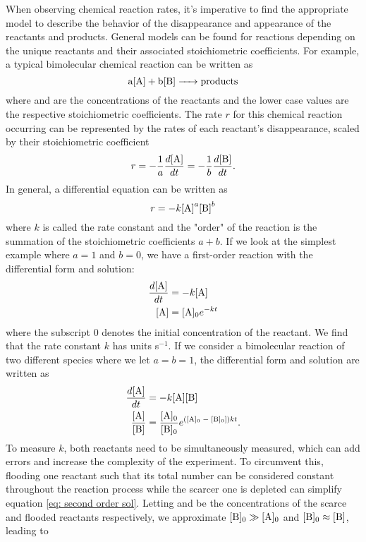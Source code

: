When observing chemical reaction rates, it's imperative to find the appropriate model to describe the behavior of the disappearance and appearance of the reactants and products. General models can be found for reactions depending on the unique reactants and their associated stoichiometric coefficients. For example, a typical bimolecular chemical reaction can be written as
\begin{equation}
	\ce{a[A] + b[B] -> products}
	\label{eq: general reaction}
\end{equation}
where \ce{[A]} and \ce{[B]} are the concentrations of the reactants and the lower case values are the respective stoichiometric coefficients. The rate $r$ for this chemical reaction occurring can be represented by the rates of each reactant's disappearance, scaled by their stoichiometric coefficient
\begin{equation}
	r = -\frac{1}{a}\frac{d\ce{[A]}}{dt} = -\frac{1}{b}\frac{d\ce{[B]}}{dt}.
\end{equation}
In general, a differential equation can be written as
\begin{equation}
	r = -k\ce{[A]}^a\ce{[B]}^b
	\label{eq: diff rate form}
\end{equation}
where $k$ is called the rate constant and the "order" of the reaction is the summation of the stoichiometric coefficients $a+b$. If we look at the simplest example where $a=1$ and $b=0$, we have a first-order reaction with the differential form and solution:
\begin{align}
	\frac{d \ce{[A]}}{dt} & = -k\ce{[A]} \nonumber \\
	\ce{[A]} & = \ce{[A]0}e^{-kt} \label{eq: first order sol}
\end{align}
where the subscript $0$ denotes the initial concentration of the reactant. We find that the rate constant $k$ has units s$^{-1}$. If we consider a bimolecular reaction of two different species where we let $a=b=1$, the differential form and solution are written as
\begin{align}
	\frac{d \ce{[A]}}{dt} & = -k \ce{[A]}\ce{[B]} \nonumber \\
	\frac{\ce{[A]}}{\ce{[B]}} & = \frac{\ce{[A]0}}{\ce{[B]0}}e^{(\ce{[A]0 - [B]0}])kt}. \label{eq: second order sol}
\end{align}
To measure $k$, both reactants need to be simultaneously measured, which can add errors and increase the complexity of the experiment. To circumvent this, flooding one reactant such that its total number can be considered constant throughout the reaction process while the scarcer one is depleted can simplify equation \ref{eq: second order sol}. Letting \ce{[A]} and \ce{[B]} be the concentrations of the scarce and flooded reactants respectively, we approximate $\ce{[B]0} \gg \ce{[A]0}$ and $\ce{[B]0} \approx \ce{[B]}$, leading to
